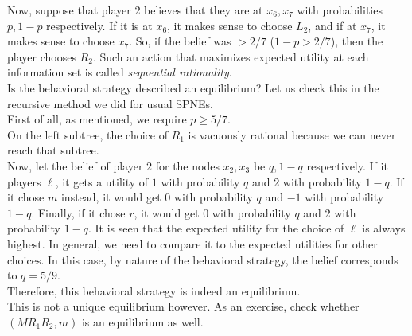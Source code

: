 \begin{fex*}
\begin{center}
			\end{center}
			Now, suppose that player $2$ believes that they are at $x_6,x_7$ with probabilities $p,1-p$ respectively. If it is at $x_6$, it makes sense to choose $L_2$, and if at $x_7$, it makes sense to choose $x_7$. So, if the belief was $>2/7$ ($1-p > 2/7$), then the player chooses $R_2$. Such an action that maximizes expected utility at each information set is called \emph{sequential rationality}.\\
			
			Is the behavioral strategy described an equilibrium? Let us check this in the recursive method we did for usual SPNEs.\\
			First of all, as mentioned, we require $p \ge 5/7$.\\
			On the left subtree, the choice of $R_1$ is vacuously rational because we can never reach that subtree.\\
			Now, let the belief of player $2$ for the nodes $x_2,x_3$ be $q,1-q$ respectively. If it players $\ell$, it gets a utility of $1$ with probability $q$ and $2$ with probability $1-q$. If it chose $m$ instead, it would get $0$ with probability $q$ and $-1$ with probability $1-q$. Finally, if it chose $r$, it would get $0$ with probability $q$ and $2$ with probability $1-q$. It is seen that the expected utility for the choice of $\ell$ is always highest. In general, we need to compare it to the expected utilities for other choices. In this case, by nature of the behavioral strategy, the belief corresponds to $q = 5/9$.\\
			Therefore, this behavioral strategy is indeed an equilibrium.\\
			This is not a unique equilibrium however. As an exercise, check whether $(MR_1R_2,m)$ is an equilibrium as well.
		\end{fex*}
		

